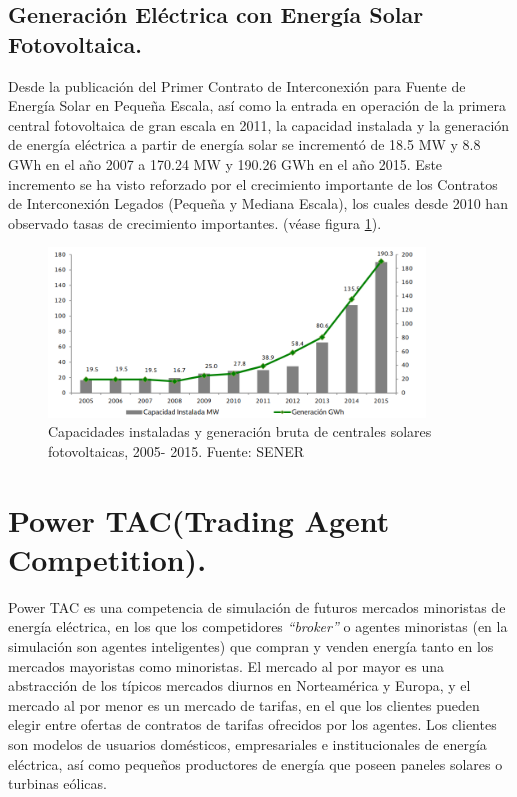 \subsection{Generación Eléctrica con Energía Solar Fotovoltaica.}
Desde la publicación del Primer Contrato de Interconexión para Fuente de Energía Solar en Pequeña Escala, así como la entrada en operación de la primera central fotovoltaica de gran escala en 2011, la capacidad instalada y la generación de energía eléctrica a partir de energía solar se incrementó de 18.5 MW y 8.8 GWh en el año 2007 a 170.24 MW y 190.26 GWh en el año 2015. Este incremento se ha visto reforzado por el crecimiento importante de los Contratos de Interconexión Legados (Pequeña y Mediana Escala), los cuales desde 2010 han observado tasas de crecimiento importantes. (véase figura \ref{solar}).

\begin{figure}[!h]
	\centering
	\includegraphics[width=10cm]{img/solar.png}
	\caption{Capacidades instaladas y generación bruta de centrales solares fotovoltaicas, 2005- 2015. Fuente: SENER}
	\label{solar}
\end{figure}

\section{Power TAC(Trading Agent Competition).}

Power TAC es una competencia de simulación de futuros mercados minoristas de energía eléctrica, en los que los competidores \textit{``broker''} o agentes minoristas (en la simulación son agentes inteligentes) que compran y venden energía tanto en los mercados mayoristas como minoristas. 
El mercado al por mayor es una abstracción de los típicos mercados diurnos en Norteamérica y Europa, y el mercado al por menor es un mercado de tarifas, en el que los clientes pueden elegir entre ofertas de contratos de tarifas ofrecidos por los agentes. Los clientes son modelos de usuarios domésticos, empresariales e institucionales de energía eléctrica, así como pequeños productores de energía que poseen paneles solares o turbinas eólicas.\\

